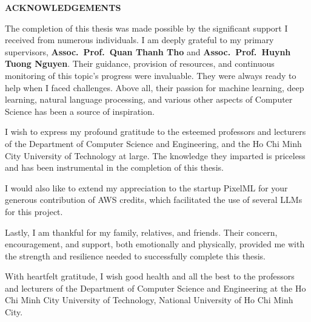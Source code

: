\documentclass[a4paper,oneside]{book}
\begin{document}
\newpage
\begin{titlepage}
    \begin{center}
        \large\bf ACKNOWLEDGEMENTS
    \end{center}
    The completion of this thesis was made possible by the significant support I received from numerous individuals. I am deeply grateful to my primary supervisors, \textbf{Assoc.\ Prof.\ Quan Thanh Tho} and \textbf{Assoc.\ Prof.\ Huynh Tuong Nguyen}. Their guidance, provision of resources, and continuous monitoring of this topic's progress were invaluable. They were always ready to help when I faced challenges. Above all, their passion for machine learning, deep learning, natural language processing, and various other aspects of Computer Science has been a source of inspiration.

    I wish to express my profound gratitude to the esteemed professors and lecturers of the Department of Computer Science and Engineering, and the Ho Chi Minh City University of Technology at large. The knowledge they imparted is priceless and has been instrumental in the completion of this thesis.

    I would also like to extend my appreciation to the startup PixelML for your generous contribution of AWS credits, which facilitated the use of several LLMs for this project.

    Lastly, I am thankful for my family, relatives, and friends. Their concern, encouragement, and support, both emotionally and physically, provided me with the strength and resilience needed to successfully complete this thesis.

    With heartfelt gratitude, I wish good health and all the best to the professors and lecturers of the Department of Computer Science and Engineering at the Ho Chi Minh City University of Technology, National University of Ho Chi Minh City.
\end{titlepage}
\end{document}
